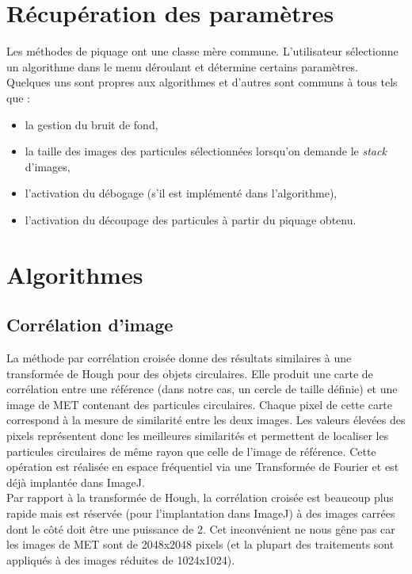 \section{Récupération des paramètres}

Les méthodes de piquage ont une classe mère commune. L'utilisateur sélectionne un algorithme dans le menu déroulant et détermine certains paramètres. Quelques uns sont propres aux algorithmes et d'autres sont communs à tous tels que :

\begin{itemize}
\item la gestion du bruit de fond,
\item la taille des images des particules sélectionnées lorsqu'on demande le \textit{stack} d'images,
\item l'activation du débogage (s'il est implémenté dans l'algorithme),
\item l'activation du découpage des particules à partir du piquage obtenu.
\end{itemize}

\section{Algorithmes}

\subsection{Corrélation d'image}

La méthode par corrélation croisée donne des résultats similaires à une transformée de Hough pour des objets circulaires. Elle produit une carte de corrélation entre une référence (dans notre cas, un cercle de taille définie) et une image de MET contenant des particules circulaires. Chaque pixel de cette carte correspond à la mesure de similarité entre les deux images. Les valeurs élevées des pixels représentent donc les meilleures similarités et permettent de localiser les particules circulaires de même rayon que celle de l'image de référence. Cette opération est réalisée en espace fréquentiel via une Transformée de Fourier et est déjà implantée dans ImageJ. \\
Par rapport à la transformée de Hough, la corrélation croisée est beaucoup plus rapide mais est réservée (pour l'implantation dans ImageJ) à des images carrées dont le côté doit être une puissance de 2. Cet inconvénient ne nous gêne pas car les images de MET sont de 2048x2048 pixels (et la plupart des traitements sont appliqués à des images réduites de 1024x1024). \\

